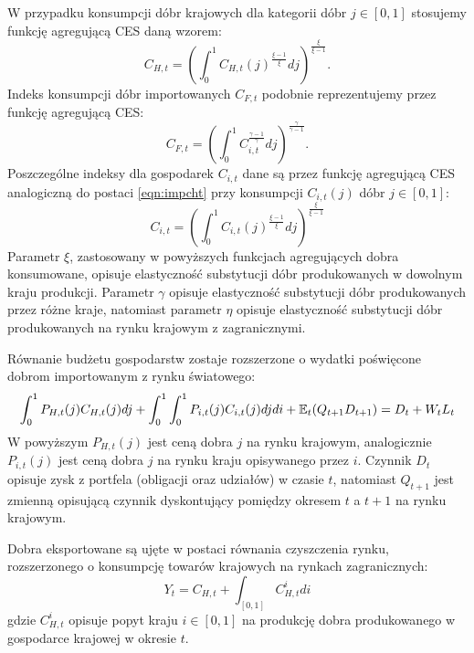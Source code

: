 W przypadku konsumpcji dóbr krajowych dla kategorii dóbr $j \in [0,1]$ stosujemy funkcję agregującą CES daną wzorem:
\begin{equation}
    \label{eqn:impcht}
    C_{H,t} = (\int^1_0 C_{H,t}(j)^{\frac{\xi - 1}{\xi}}dj)^{\frac{\xi}{\xi - 1}}.
\end{equation}
Indeks konsumpcji dóbr importowanych $C_{F,t}$ podobnie reprezentujemy przez funkcję agregującą CES:
\begin{equation}
    C_{F,t} = (\int^1_0 C_{i,t}^{\frac{\gamma - 1}{\gamma}}dj)^{\frac{\gamma}{\gamma - 1}}.
\end{equation}
Poszczególne indeksy dla gospodarek $C_{i,t}$ dane są przez funkcję agregującą CES analogiczną do postaci \eqref{eqn:impcht} przy konsumpcji $C_{i,t}(j)$ dóbr $j \in [0,1]$:
\begin{equation}
    C_{i,t} = (\int^1_0 C_{i,t}(j)^{\frac{\xi - 1}{\xi}}dj)^{\frac{\xi}{\xi - 1}}
\end{equation}
Parametr $\xi$, zastosowany w powyższych funkcjach agregujących dobra konsumowane, opisuje elastyczność substytucji dóbr produkowanych w dowolnym kraju produkcji. Parametr $\gamma$ opisuje elastyczność substytucji dóbr produkowanych przez różne kraje, natomiast parametr $\eta$ opisuje elastyczność substytucji dóbr produkowanych na rynku krajowym z zagranicznymi.

Równanie budżetu gospodarstw zostaje rozszerzone o wydatki poświęcone dobrom importowanym z rynku światowego:
\begin{equation}
    \int_0^1 P_{H,t}(j)C_{H,t}(j)dj + \int_0^1\int_0^1 P_{i,t}(j)C_{i,t}(j) dj di + \mathbb{E}_t (Q_{t+1} D_{t+1}) 
    = D_t + W_t L_t
\end{equation}
W powyższym $P_{H,t}(j)$ jest ceną dobra $j$ na rynku krajowym, analogicznie $P_{i,t}(j)$ jest ceną dobra $j$ na rynku kraju opisywanego przez $i$. Czynnik $D_t$ opisuje zysk z portfela (obligacji oraz udziałów) w czasie $t$, natomiast $Q_{t+1}$ jest zmienną opisującą czynnik dyskontujący pomiędzy okresem $t$ a $t+1$ na rynku krajowym.
 
Dobra eksportowane są ujęte w postaci równania czyszczenia rynku, rozszerzonego o konsumpcję towarów krajowych na rynkach zagranicznych:
\begin{equation}
    Y_t = C_{H,t} + \int_{[0,1]} C^i_{H,t} di
\end{equation}
gdzie $C^i_{H,t}$ opisuje popyt kraju $i \in [0,1]$ na produkcję dobra produkowanego w gospodarce krajowej w okresie $t$.

